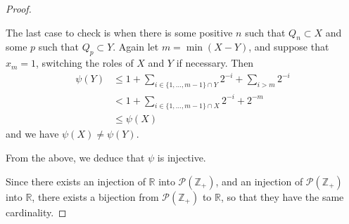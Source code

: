 \documentclass[11pt,a4paper,twoside]{article}
\theoremstyle{definition}
\begin{document}
\begin{proof}
\begin{description}
      The last case to check is when there is some positive $n$ such that $Q_n \subset X$ and some $p$ such that $Q_p \subset Y$.
      Again let $m = \min (X - Y)$, and suppose that $x_m = 1$, switching the roles of $X$ and $Y$ if necessary. Then
      \begin{align*}
        \psi ( Y ) &\leq 1 + \sum_{i \in \{ 1, \dotsc, m - 1 \} \cap Y} 2^{- i} + \sum_{i > m} 2^{- i} \\
        &< 1 + \sum_{i \in \{ 1, \dotsc, m - 1 \} \cap X} 2^{- i} + 2^{- m} \\
        &\leq \psi ( X )
      \end{align*}
      and we have $\psi ( X ) \neq \psi ( Y )$.

      From the above, we deduce that $\psi$ is injective.

  \end{description}

  Since there exists an injection of $\mathbb{R}$ into $\mathscr{P} ( \mathbb{Z}_+ )$, and an injection of $\mathscr{P} ( \mathbb{Z}_+ )$ into $\mathbb{R}$,
  there exists a bijection from $\mathscr{P} ( \mathbb{Z}_+ )$ to $\mathbb{R}$, so that they have the same cardinality.

\end{proof}
\end{document}
